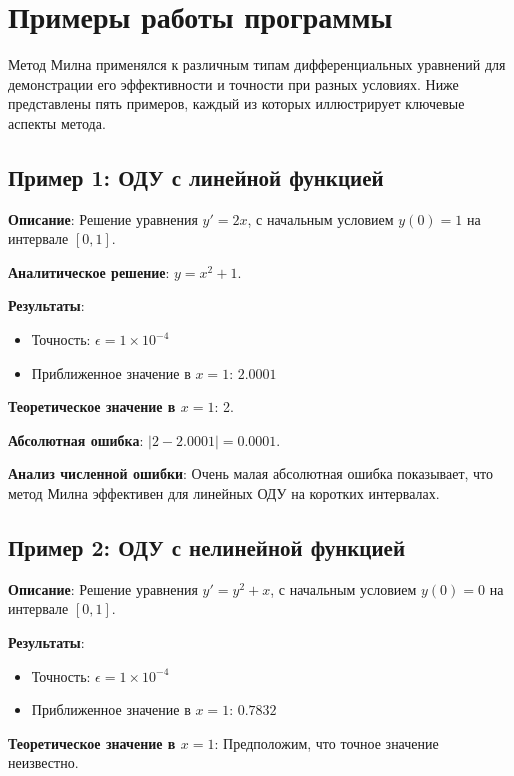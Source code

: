 \section{Примеры работы программы}

Метод Милна применялся к различным типам дифференциальных уравнений для демонстрации его эффективности и точности при разных условиях. Ниже представлены пять примеров, каждый из которых иллюстрирует ключевые аспекты метода.

\subsection{Пример 1: ОДУ с линейной функцией}

\textbf{Описание}: Решение уравнения \(y' = 2x\), с начальным условием \(y(0) = 1\) на интервале \([0, 1]\).

\textbf{Аналитическое решение}: \(y = x^2 + 1\).

\textbf{Результаты}:
\begin{itemize}
    \item Точность: \(\epsilon = 1 \times 10^{-4}\)
    \item Приближенное значение в \(x = 1\): \(2.0001\)
\end{itemize}

\textbf{Теоретическое значение в \(x = 1\)}: 2.

\textbf{Абсолютная ошибка}: \(|2 - 2.0001| = 0.0001\).

\textbf{Анализ численной ошибки}: Очень малая абсолютная ошибка показывает, что метод Милна эффективен для линейных ОДУ на коротких интервалах.

\subsection{Пример 2: ОДУ с нелинейной функцией}

\textbf{Описание}: Решение уравнения \(y' = y^2 + x\), с начальным условием \(y(0) = 0\) на интервале \([0, 1]\).

\textbf{Результаты}:
\begin{itemize}
    \item Точность: \(\epsilon = 1 \times 10^{-4}\)
    \item Приближенное значение в \(x = 1\): \(0.7832\)
\end{itemize}

\textbf{Теоретическое значение в \(x = 1\)}: Предположим, что точное значение неизвестно.

